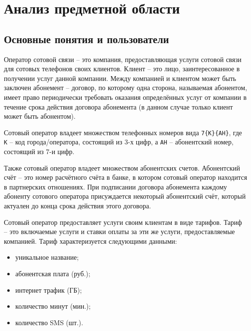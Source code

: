 \section{Анализ предметной области}\label{sec:domain-analysis}




\subsection{Основные понятия и пользователи}


Оператор сотовой связи -- это компания, предоставляющая услуги сотовой связи для сотовых телефонов своих клиентов. Клиент -- это лицо, заинтересованное в получении услуг данной компании. Между компанией и клиентом может быть заключен абонемент -- договор, по которому одна сторона, называемая абонентом, имеет право периодически требовать оказания определённых услуг от компании в течение срока действия договора абонемента (в данном случае только клиент может быть абонентом).

Сотовый оператор владеет множеством телефонных номеров вида \texttt{7\{К\}\{АН\}}, где \texttt{К} -- код города/оператора, состоящий из 3-х цифр, а \texttt{АН} -- абонентский номер, состоящий из 7-и цифр. %

Также сотовый оператор владеет множеством абонентских счетов. Абонентский счёт -- это номер расчётного счёта в банке, в котором сотовый оператор находится в партнерских отношениях. При подписании договора абонемента каждому абоненту сотового оператора присуждается некоторый абонентский счёт, который актуален до конца срока действия этого договора.

Сотовый оператор предоставляет услуги своим клиентам в виде тарифов. Тариф -- это включаемые услуги и ставки оплаты за эти же услуги, предоставляемые компанией. Тариф характеризуется следующими данными:
\begin{itemize}
    \item уникальное название;
    \item абонентская плата (руб.);
    \item интернет трафик (ГБ);
    \item количество минут (мин.);
    \item количество SMS (шт.).
\end{itemize}

